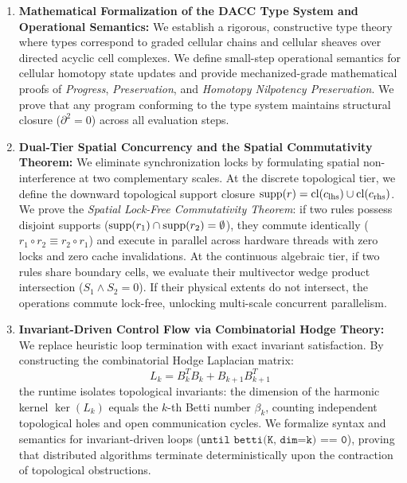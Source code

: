 \begin{enumerate}[leftmargin=1.2cm]
    \item \textbf{Mathematical Formalization of the DACC Type System and Operational Semantics:}  
    We establish a rigorous, constructive type theory where types correspond to graded cellular chains and cellular sheaves over directed acyclic cell complexes. We define small-step operational semantics for cellular homotopy state updates and provide mechanized-grade mathematical proofs of \textit{Progress}, \textit{Preservation}, and \textit{Homotopy Nilpotency Preservation}. We prove that any program conforming to the \ToposLang{} type system maintains structural closure ($\partial^2 = 0$) across all evaluation steps.

    \item \textbf{Dual-Tier Spatial Concurrency and the Spatial Commutativity Theorem:}  
    We eliminate synchronization locks by formulating spatial non-interference at two complementary scales. At the discrete topological tier, we define the downward topological support closure $\operatorname{supp}(r) = \operatorname{cl}(c_{\text{lhs}}) \cup \operatorname{cl}(c_{\text{rhs}})$. We prove the \textit{Spatial Lock-Free Commutativity Theorem}: if two rules possess disjoint supports ($\operatorname{supp}(r_1) \cap \operatorname{supp}(r_2) = \emptyset$), they commute identically ($r_1 \circ r_2 \equiv r_2 \circ r_1$) and execute in parallel across hardware threads with zero locks and zero cache invalidations. At the continuous algebraic tier, if two rules share boundary cells, we evaluate their multivector wedge product intersection ($S_1 \wedge S_2 = 0$). If their physical extents do not intersect, the operations commute lock-free, unlocking multi-scale concurrent parallelism.

    \item \textbf{Invariant-Driven Control Flow via Combinatorial Hodge Theory:}  
    We replace heuristic loop termination with exact invariant satisfaction. By constructing the combinatorial Hodge Laplacian matrix:
    \begin{equation}
        L_k = B_k^T B_k + B_{k+1} B_{k+1}^T
    \end{equation}
    the runtime isolates topological invariants: the dimension of the harmonic kernel $\ker(L_k)$ equals the $k$-th Betti number $\beta_k$, counting independent topological holes and open communication cycles. We formalize syntax and semantics for invariant-driven loops ($\texttt{until betti(K, dim=k) == 0}$), proving that distributed algorithms terminate deterministically upon the contraction of topological obstructions.


\end{enumerate}
